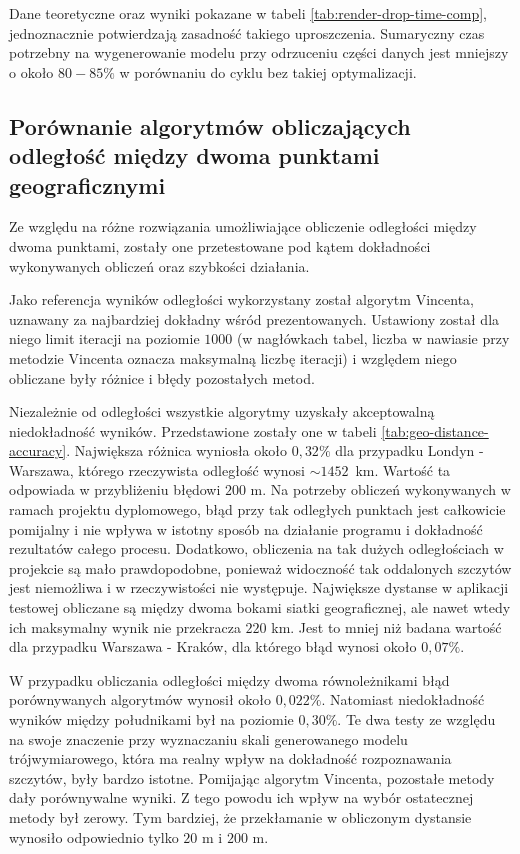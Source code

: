 Dane teoretyczne oraz wyniki pokazane w tabeli \ref{tab:render-drop-time-comp}, jednoznacznie potwierdzają zasadność takiego uproszczenia. Sumaryczny czas potrzebny na wygenerowanie modelu przy odrzuceniu części danych jest mniejszy o około $80-85\%$ w porównaniu do cyklu bez takiej optymalizacji.





\subsection{Porównanie algorytmów obliczających odległość między dwoma punktami geograficznymi}

Ze względu na różne rozwiązania umożliwiające obliczenie odległości między dwoma punktami, zostały one przetestowane pod kątem dokładności wykonywanych obliczeń oraz szybkości działania.

Jako referencja wyników odległości wykorzystany został algorytm Vincenta, uznawany za najbardziej dokładny wśród prezentowanych. Ustawiony został dla niego limit iteracji na poziomie $1000$ (w nagłówkach tabel, liczba w nawiasie przy metodzie Vincenta oznacza maksymalną liczbę iteracji) i względem niego obliczane były różnice i błędy pozostałych metod.


Niezależnie od odległości wszystkie algorytmy uzyskały akceptowalną niedokładność wyników. Przedstawione zostały one w tabeli \ref{tab:geo-distance-accuracy}. Największa różnica wyniosła około $0,32\%$ dla przypadku Londyn - Warszawa, którego rzeczywista odległość wynosi $\sim1452$~km. Wartość ta odpowiada w przybliżeniu błędowi $200$ m. Na potrzeby obliczeń wykonywanych w ramach projektu dyplomowego, błąd przy tak odległych punktach jest całkowicie pomijalny i nie wpływa w istotny sposób na działanie programu i dokładność rezultatów całego procesu. Dodatkowo, obliczenia na tak dużych odległościach w projekcie są mało prawdopodobne, ponieważ widoczność tak oddalonych szczytów jest niemożliwa i w rzeczywistości nie występuje. Największe dystanse w aplikacji testowej obliczane są między dwoma bokami siatki geograficznej, ale nawet wtedy ich maksymalny wynik nie przekracza $220$ km. Jest to mniej niż badana wartość dla przypadku Warszawa - Kraków, dla którego błąd wynosi około $0,07\%$. 




W przypadku obliczania odległości między dwoma równoleżnikami błąd porównywanych algorytmów wynosił około $0,022\%$. Natomiast niedokładność wyników między południkami był na poziomie $0,30\%$. Te dwa testy ze względu na swoje znaczenie przy wyznaczaniu skali generowanego modelu trójwymiarowego, która ma realny wpływ na dokładność rozpoznawania szczytów, były bardzo istotne. Pomijając algorytm Vincenta, pozostałe metody dały porównywalne wyniki. Z tego powodu ich wpływ na wybór ostatecznej metody był zerowy. Tym bardziej, że przekłamanie w obliczonym dystansie wynosiło odpowiednio tylko $20$ m i $200$ m.

